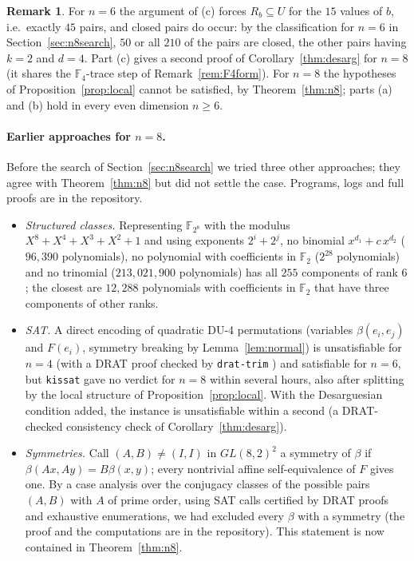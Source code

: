 \documentclass[11pt]{article}
\theoremstyle{definition}
\newtheorem{remark}[theorem]{Remark}
\newcommand{\F}{\mathbb{F}}
\begin{document}
\begin{remark}
For $n=6$ the argument of (c) forces $R_b\subseteq U$ for the $15$ values of $b$, i.e.\ exactly $45$
pairs, and closed pairs do occur: by the classification for $n=6$ in Section~\ref{sec:n8search},
$50$ or all $210$ of the pairs are closed, the other pairs having $k=2$ and $d=4$. Part (c) gives a
second proof of Corollary~\ref{thm:desarg} for $n=8$ (it shares the $\F_4$-trace step of
Remark~\ref{rem:F4form}). For
$n=8$ the hypotheses of Proposition~\ref{prop:local} cannot be satisfied, by
Theorem~\ref{thm:n8}; parts (a) and (b) hold in every even dimension $n\ge6$.
\end{remark}


\paragraph{Earlier approaches for $n=8$.} Before the search of Section~\ref{sec:n8search} we
tried three other approaches; they agree with Theorem~\ref{thm:n8} but did not settle the case.
Programs, logs and full proofs are in the repository.
\begin{itemize}
\item \emph{Structured classes.} Representing $\F_{2^8}$ with the modulus $X^8+X^4+X^3+X^2+1$ and
using exponents $2^i+2^j$, no binomial $x^{d_1}+c\,x^{d_2}$ ($96{,}390$ polynomials), no
polynomial with coefficients in $\F_2$ ($2^{28}$ polynomials) and no trinomial
($213{,}021{,}900$ polynomials) has all $255$ components of rank $6$; the closest are $12{,}288$
polynomials with coefficients in $\F_2$ that have three components of other ranks.
\item \emph{SAT.} A direct encoding of quadratic DU-4 permutations (variables $\beta(e_i,e_j)$
and $F(e_i)$, symmetry breaking by Lemma~\ref{lem:normal}) is unsatisfiable for $n=4$ (with a
DRAT proof checked by \texttt{drat-trim} \cite{WHH14}) and satisfiable for $n=6$, but
\texttt{kissat} \cite{Kissat} gave no verdict for $n=8$ within several hours, also after
splitting by the local structure of Proposition~\ref{prop:local}. With the Desarguesian condition
added, the instance is unsatisfiable within a second (a DRAT-checked consistency check of
Corollary~\ref{thm:desarg}).
\item \emph{Symmetries.} Call $(A,B)\neq(I,I)$ in $GL(8,2)^2$ a symmetry of $\beta$ if
$\beta(Ax,Ay)=B\beta(x,y)$; every nontrivial affine self-equivalence of $F$ gives one. By a case
analysis over the conjugacy classes of the possible pairs $(A,B)$ with $A$ of prime order, using
SAT calls certified by DRAT proofs and exhaustive enumerations, we had excluded every $\beta$
with a symmetry (the proof and the computations are in the repository). This statement is now
contained in Theorem~\ref{thm:n8}.
\end{itemize}
\end{document}
